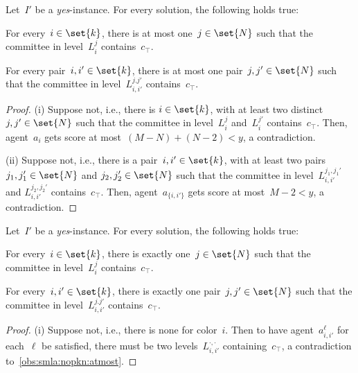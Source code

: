 \documentclass[10pt,a4paper,twocolumn]{article}
\theoremstyle{plain}
\theoremstyle{definition}
\theoremstyle{remark}
\newcommand{\yes}{\emph{yes}}
\newcommand{\true}{\top}
\begin{document}
{{{\begin{observation}%
 \label{obs:smla:nopkn:atmost}
 Let~$I'$ be a \yes-instance.
 For every solution,
 the following holds true:
 \begin{compactenum}[(i)]
  \item For every~$i\in\set{k}$,
 there is at most one~$j\in\set{N}$
 such that the committee in level~$L_i^j$ contains~$c_\true$.
  \item For every pair~$i,i'\in\set{k}$,
 there is at most one pair~$j,j'\in\set{N}$
 such that the committee in level~$L_{i,i'}^{j.j'}$ 
 contains~$c_\true$.
 \end{compactenum}
\end{observation}

%
{
  \begin{proof}
  (i) Suppose not,
  i.e.,
  there is $i\in\set{k}$,
  with at least two distinct~$j,j'\in\set{N}$
  such that the committee in level~$L_i^j$ and~$L_i^{j'}$ contains~$c_\true$.
  Then,
  agent~$a_i$ gets score at most~$(M-N)+(N-2)<y$,
  a contradiction.
  
  (ii) Suppose not,
  i.e.,
  there is a pair~$i,i'\in\set{k}$,
  with at least two pairs~$j_1,j_1'\in\set{N}$ and $j_2,j_2'\in\set{N}$
  such that the committee in level~$L_{i,i'}^{j_1,j_1'}$
  and $L_{i,i'}^{j_2,j_2'}$ 
  contains~$c_\true$.
  Then,
  agent~$a_{\{i,i'\}}$ gets score at most~$M-2<y$,
  a contradiction.
  \end{proof}
}

\begin{observation}%
 \label{obs:smla:nopkn:exact}
 Let~$I'$ be a \yes-instance.
 For every solution,
 the following holds true:
 \begin{compactenum}[(i)]
  \item For every~$i\in\set{k}$,
 there is exactly one~$j\in\set{N}$
 such that the committee in level~$L_i^j$ contains~$c_\true$.
  \item For every~$i,i'\in\set{k}$,
 there is exactly one pair~$j,j'\in\set{N}$
 such that the committee in level~$L_{i,i'}^{j.j'}$ 
 contains~$c_\true$.
 \end{compactenum}
\end{observation}

%
{
  \begin{proof}
  (i) Suppose not,
  i.e.,
  there is none for color~$i$.
  Then to have agent~$a_{i,i'}^\ell$ for each~$\ell$
  be satisfied,
  there must be two levels~$L_{i,i'}^{\cdot,\cdot}$ containing~$c_\true$,
  a contradiction to~\cref{obs:smla:nopkn:atmost}.
  

\end{proof}}}}}
\end{document}

